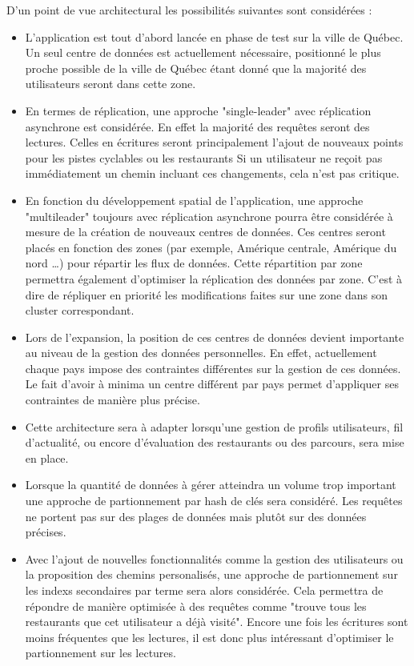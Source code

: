 \documentclass[12pt]{article}
\begin{document}
    D'un point de vue architectural les possibilités suivantes sont considérées :

    \begin{itemize}
        \item L'application est tout d'abord lancée en phase de test sur la ville de Québec. Un seul centre de données est actuellement nécessaire, positionné le plus proche possible de la ville de Québec étant donné que la majorité des utilisateurs seront dans cette zone.
        \item En termes de réplication, une approche "single-leader" avec réplication asynchrone est considérée. En effet la majorité des requêtes seront des lectures. Celles en écritures seront principalement l'ajout de nouveaux points pour les pistes cyclables ou les restaurants Si un utilisateur ne reçoit pas immédiatement un chemin incluant ces changements, cela n'est pas critique.
        \item En fonction du développement spatial de l'application, une approche "multileader" toujours avec réplication asynchrone pourra être considérée à mesure de la création de nouveaux centres de données. Ces centres seront placés en fonction des zones (par exemple, Amérique centrale, Amérique du nord \dots) pour répartir les flux de données. Cette répartition par zone permettra également d'optimiser la réplication des données par zone. C'est à dire de répliquer en priorité les modifications faites sur une zone dans son cluster correspondant.
        \item Lors de l'expansion, la position de ces centres de données devient importante au niveau de la gestion des données personnelles. En effet, actuellement chaque pays impose des contraintes différentes sur la gestion de ces données. Le fait d'avoir à minima un centre différent par pays permet d'appliquer ses contraintes de manière plus précise. 
        \item Cette architecture sera à adapter lorsqu'une gestion de profils utilisateurs, fil d'actualité, ou encore d'évaluation des restaurants ou des parcours, sera mise en place.
        \item Lorsque la quantité de données à gérer atteindra un volume trop important une approche de partionnement par hash de clés sera considéré. Les requêtes ne portent pas sur des plages de données mais plutôt sur des données précises.
        \item Avec l'ajout de nouvelles fonctionnalités comme la gestion des utilisateurs ou la proposition des chemins personalisés, une approche de partionnement sur les indexs secondaires par terme sera alors considérée. Cela permettra de répondre de manière optimisée à des requêtes comme "trouve tous les restaurants que cet utilisateur a déjà visité". Encore une fois les écritures sont moins fréquentes que les lectures, il est donc plus intéressant d'optimiser le partionnement sur les lectures. 
    \end{itemize}
\end{document}
